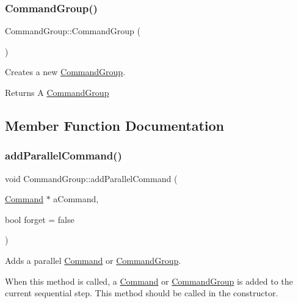 \subsubsection{\texorpdfstring{CommandGroup()}{CommandGroup()}}
{\footnotesize\ttfamily Command\+Group\+::\+Command\+Group (\begin{DoxyParamCaption}{ }\end{DoxyParamCaption})}



Creates a new \mbox{\hyperlink{classlib_iterative_robot_1_1_command_group}{Command\+Group}}. 

\begin{DoxyReturn}{Returns}
A \mbox{\hyperlink{classlib_iterative_robot_1_1_command_group}{Command\+Group}} 
\end{DoxyReturn}


\subsection{Member Function Documentation}
\mbox{\label{classlib_iterative_robot_1_1_command_group_a7255a0b640e74ce74870939b45d23a58}} 
\subsubsection{\texorpdfstring{addParallelCommand()}{addParallelCommand()}}
{\footnotesize\ttfamily void Command\+Group\+::add\+Parallel\+Command (\begin{DoxyParamCaption}\item[{\mbox{\hyperlink{classlib_iterative_robot_1_1_command}{Command}} $\ast$}]{a\+Command,  }\item[{bool}]{forget = {\ttfamily false} }\end{DoxyParamCaption})}



Adds a parallel \mbox{\hyperlink{classlib_iterative_robot_1_1_command}{Command}} or \mbox{\hyperlink{classlib_iterative_robot_1_1_command_group}{Command\+Group}}. 

When this method is called, a \mbox{\hyperlink{classlib_iterative_robot_1_1_command}{Command}} or \mbox{\hyperlink{classlib_iterative_robot_1_1_command_group}{Command\+Group}} is added to the current sequential step. This method should be called in the constructor.


